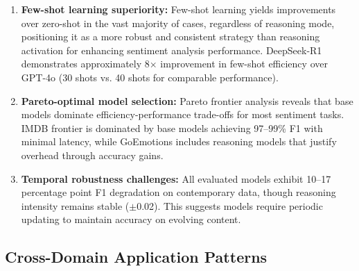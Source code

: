 \begin{enumerate}[leftmargin=*]
    \item \textbf{Few-shot learning superiority:} Few-shot learning yields improvements over zero-shot in the vast majority of cases, regardless of reasoning mode, positioning it as a more robust and consistent strategy than reasoning activation for enhancing sentiment analysis performance. DeepSeek-R1 demonstrates approximately 8$\times$ improvement in few-shot efficiency over GPT-4o (30 shots vs. 40 shots for comparable performance).
    
    \item \textbf{Pareto-optimal model selection:} Pareto frontier analysis reveals that base models dominate efficiency-performance trade-offs for most sentiment tasks. IMDB frontier is dominated by base models achieving 97--99\% F1 with minimal latency, while GoEmotions includes reasoning models that justify overhead through accuracy gains.
    
    \item \textbf{Temporal robustness challenges:} All evaluated models exhibit 10--17 percentage point F1 degradation on contemporary data, though reasoning intensity remains stable ($\pm$0.02). This suggests models require periodic updating to maintain accuracy on evolving content.
\end{enumerate}

\subsection{Cross-Domain Application Patterns}

